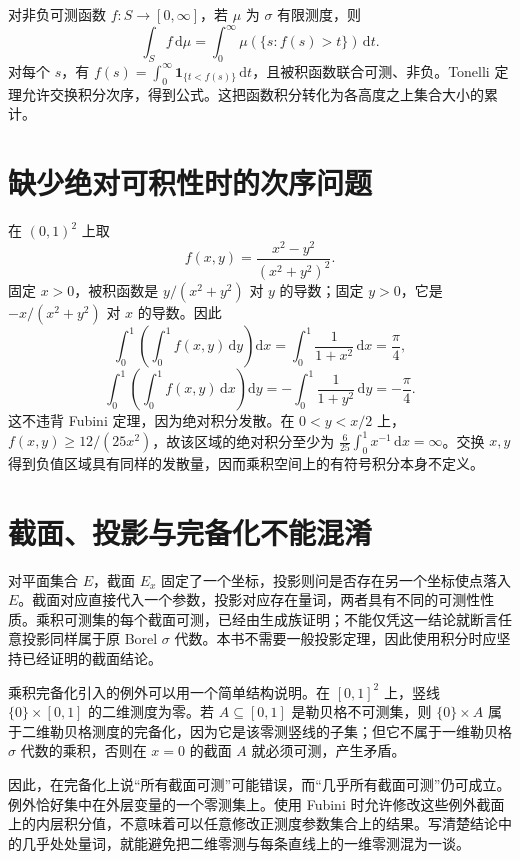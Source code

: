 \begin{example}[由水平集表示积分]
对非负可测函数 $f:S\to[0,\infty]$，若 $\mu$ 为 $\sigma$ 有限测度，则
\begin{equation}
 \int_S f\,\mathrm d\mu
 =\int_0^\infty\mu(\{s:f(s)>t\})\,\mathrm dt.
 \label{eq:mt-layer-cake}
\end{equation}
对每个 $s$，有 $f(s)=\int_0^\infty\mathbf1_{\{t<f(s)\}}\,\mathrm dt$，且被积函数联合可测、非负。Tonelli 定理允许交换积分次序，得到公式。这把函数积分转化为各高度之上集合大小的累计。
\end{example}

\section{缺少绝对可积性时的次序问题}
\begin{example}[两个迭代积分存在但不相等]
在 $(0,1)^2$ 上取
\[
 f(x,y)=\frac{x^2-y^2}{(x^2+y^2)^2}.
\]
固定 $x>0$，被积函数是 $y/(x^2+y^2)$ 对 $y$ 的导数；固定 $y>0$，它是 $-x/(x^2+y^2)$ 对 $x$ 的导数。因此
\[
 \int_0^1\left(\int_0^1 f(x,y)\,\mathrm dy\right)\mathrm dx
 =\int_0^1\frac{1}{1+x^2}\,\mathrm dx=\frac{\pi}{4},
\]
\[
 \int_0^1\left(\int_0^1 f(x,y)\,\mathrm dx\right)\mathrm dy
 =-\int_0^1\frac{1}{1+y^2}\,\mathrm dy=-\frac{\pi}{4}.
\]
这不违背 Fubini 定理，因为绝对积分发散。在 $0<y<x/2$ 上，
$f(x,y)\geq12/(25x^2)$，故该区域的绝对积分至少为
$\frac6{25}\int_0^1x^{-1}\,\mathrm dx=\infty$。交换 $x,y$ 得到负值区域具有同样的发散量，因而乘积空间上的有符号积分本身不定义。
\end{example}

\section{截面、投影与完备化不能混淆}
对平面集合 $E$，截面 $E_x$ 固定了一个坐标，投影则问是否存在另一个坐标使点落入 $E$。截面对应直接代入一个参数，投影对应存在量词，两者具有不同的可测性性质。乘积可测集的每个截面可测，已经由生成族证明；不能仅凭这一结论就断言任意投影同样属于原 Borel $\sigma$ 代数。本书不需要一般投影定理，因此使用积分时应坚持已经证明的截面结论。

乘积完备化引入的例外可以用一个简单结构说明。在 $[0,1]^2$ 上，竖线 $\{0\}\times[0,1]$ 的二维测度为零。若 $A\subseteq[0,1]$ 是勒贝格不可测集，则 $\{0\}\times A$ 属于二维勒贝格测度的完备化，因为它是该零测竖线的子集；但它不属于一维勒贝格 $\sigma$ 代数的乘积，否则在 $x=0$ 的截面 $A$ 就必须可测，产生矛盾。

因此，在完备化上说“所有截面可测”可能错误，而“几乎所有截面可测”仍可成立。例外恰好集中在外层变量的一个零测集上。使用 Fubini 时允许修改这些例外截面上的内层积分值，不意味着可以任意修改正测度参数集合上的结果。写清楚结论中的几乎处处量词，就能避免把二维零测与每条直线上的一维零测混为一谈。

